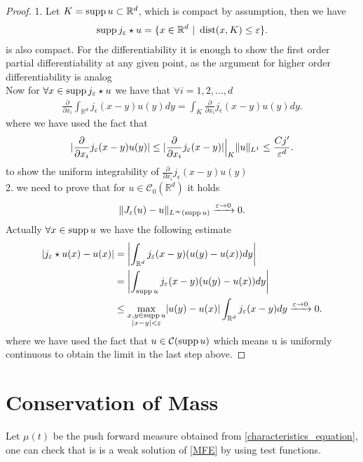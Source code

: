 \begin{proof}
 1. Let $K = \supp u \subset  \mathbb{R}^{d} $, which is compact by assumption, then we have 
 \begin{align*}
   \supp j_{\epsilon} \star  u = \{x \in  \mathbb{R}^{d} \ | \ \dist(x,K) \le \epsilon  \}  
 .\end{align*}
 is also compact. For the differentiability  it is enough to show the first order partial 
 differentiability at any given point, as the argument for higher order differentiability is analog\\[1ex]
 Now for $\forall  x \in  \supp j_{\epsilon} \star  u$  we have that $\forall i = 1,2,\ldots ,d$ 
 \begin{align*}
   \frac{\partial }{\partial x_i}  \int_{\mathbb{R}^{d} } j_{\epsilon}(x-y)u(y) dy = \int_K \frac{\partial }{\partial x_i} j_{\epsilon}(x-y)u(y) dy
 .\end{align*}
 where we have used the fact that 
 \begin{align*}
   \abs{\frac{\partial }{\partial x_i} j_{\epsilon}(x-y)u(y)} \le \abs{\frac{\partial }{\partial x_i}j_{\epsilon}(x-y) } \Big|_K\|u\|_{L^{1} } \le  \frac{Cj'}{\epsilon ^{d} }
 .\end{align*}
 to show the uniform integrability of $\frac{\partial }{\partial x_i}j_{\epsilon}(x-y)u(y) $\\[1ex]
2. we need to prove that for $u \in  \mathcal{C}_0(\mathbb{R}^{d} )$ it holds 
 \begin{align*}
   \|J_{\epsilon}(u)-u\|_{L^{\infty}(\supp u) } \xrightarrow{\epsilon \to 0} 0
 .\end{align*}
 Actually $\forall  x \in \supp u$ we have the following estimate
 \begin{align*}
   \abs{j_{\epsilon}\star u(x) - u(x)} &= \abs*{\int_{\mathbb{R}^{d} }j_{\epsilon}(x-y)(u(y)-u(x)) dy}\\
                                       &= \abs*{\int_{\supp u} j_{\epsilon}(x-y)(u(y)-u(x)) dy}\\
                                       &\le \max_{\substack{x,y \in \supp u \\ \abs{x-y} < \epsilon}} \abs{u(y)-u(x)} \int_{\mathbb{R}^{d} }j_{\epsilon}(x-y)dy \xrightarrow{\epsilon \to 0} 0
 .\end{align*}
 where we have used the fact that $u \in  \mathcal{C}(\supp u)$ which means u is uniformly continuous to obtain the limit in the last step above.
\end{proof}
\section{Conservation of Mass}
Let $\mu(t)$ be the push forward measure obtained from \autoref{characteristics_equation}, one can check that is is a weak solution of \autoref{MFE} by using 
test functions.



